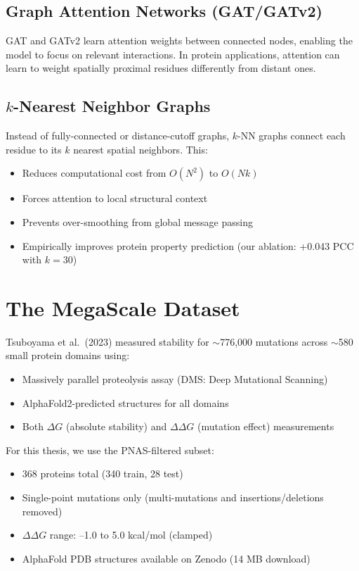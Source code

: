 \subsection{Graph Attention Networks (GAT/GATv2)}

GAT \cite{velickovic2018graph} and GATv2 \cite{brody2022how} learn attention weights between connected nodes, enabling the model to focus on relevant interactions. In protein applications, attention can learn to weight spatially proximal residues differently from distant ones.

\subsection{$k$-Nearest Neighbor Graphs}

Instead of fully-connected or distance-cutoff graphs, $k$-NN graphs connect each residue to its $k$ nearest spatial neighbors. This:
\begin{itemize}
    \item Reduces computational cost from $O(N^2)$ to $O(Nk)$
    \item Forces attention to local structural context
    \item Prevents over-smoothing from global message passing
    \item Empirically improves protein property prediction (our ablation: +0.043 PCC with $k=30$)
\end{itemize}

\section{The MegaScale Dataset}

Tsuboyama et al.\ (2023) \cite{tsuboyama2023mega} measured stability for $\sim$776,000 mutations across $\sim$580 small protein domains using:
\begin{itemize}
    \item Massively parallel proteolysis assay (DMS: Deep Mutational Scanning)
    \item AlphaFold2-predicted structures for all domains
    \item Both $\Delta G$ (absolute stability) and $\Delta\Delta G$ (mutation effect) measurements
\end{itemize}

For this thesis, we use the PNAS-filtered subset:
\begin{itemize}
    \item 368 proteins total (340 train, 28 test)
    \item Single-point mutations only (multi-mutations and insertions/deletions removed)
    \item $\Delta\Delta G$ range: --1.0 to 5.0 kcal/mol (clamped)
    \item AlphaFold PDB structures available on Zenodo (14 MB download)
\end{itemize}
